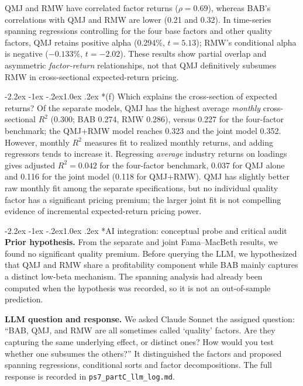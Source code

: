 \documentclass[11pt]{article}
\makeatletter
\renewcommand\subsection{\@startsection{subsection}{2}{0pt}%
  {-2.2ex \@plus -1ex \@minus -.2ex}{1.0ex \@plus .2ex}%
  {\normalfont\bfseries\normalsize\color{psink}}}
\makeatother
\begin{document}
QMJ and RMW have correlated factor returns ($\rho=0.69$),
whereas BAB's correlations with QMJ and RMW are lower (0.21 and 0.32).
In time-series spanning regressions controlling for the four base factors and
other quality factors, QMJ retains positive alpha (0.294\%, $t=5.13$); RMW's
conditional alpha is negative ($-0.133\%$, $t=-2.02$). These results show
partial overlap and asymmetric \emph{factor-return} relationships, not that
QMJ definitively subsumes RMW in cross-sectional expected-return pricing.

\subsection*{(f) Which explains the cross-section of expected returns?}
Of the separate models, QMJ has the highest average \emph{monthly} cross-sectional
$R^2$ (0.300; BAB 0.274, RMW 0.286), versus 0.227 for the four-factor
benchmark; the QMJ+RMW model reaches 0.323 and the joint model 0.352.
However, monthly $R^2$ measures fit to realized monthly returns, and adding
regressors tends to increase it. Regressing \emph{average} industry returns on
loadings gives adjusted $R^2=0.042$ for the four-factor benchmark, 0.037 for
QMJ alone and 0.116 for the joint model (0.118 for QMJ+RMW). QMJ has slightly
better raw monthly fit among the separate specifications, but no individual
quality factor has a significant pricing premium; the larger joint fit is
not compelling evidence of incremental expected-return pricing power.

\subsection*{AI integration: conceptual probe and critical audit}
\noindent\textbf{Prior hypothesis.} From the separate and joint Fama--MacBeth
results, we found no significant quality premium. Before querying the LLM,
we hypothesized that QMJ and RMW share a profitability component while BAB
mainly captures a distinct low-beta mechanism. The spanning analysis had
already been computed when the hypothesis was recorded, so it is not an
out-of-sample prediction.

\noindent\textbf{LLM question and response.} We asked Claude Sonnet the assigned
question: ``BAB, QMJ, and RMW are all sometimes called `quality' factors. Are
they capturing the same underlying effect, or distinct ones? How would you
test whether one subsumes the others?'' It distinguished the factors and
proposed spanning regressions, conditional sorts and factor decompositions.
The full response is recorded in \texttt{ps7\_partC\_llm\_log.md}.
\end{document}
